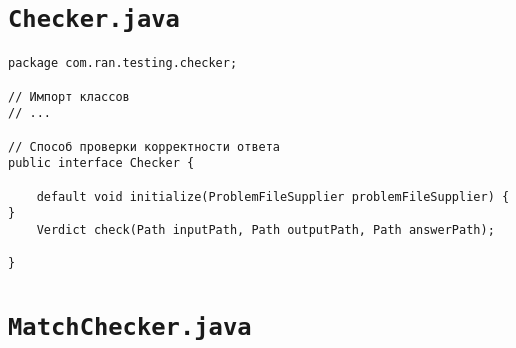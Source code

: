 \section*{\texttt{Checker.java}}
\begin{verbatim}
package com.ran.testing.checker;

// Импорт классов
// ...

// Способ проверки корректности ответа
public interface Checker {

    default void initialize(ProblemFileSupplier problemFileSupplier) { }
    Verdict check(Path inputPath, Path outputPath, Path answerPath);

}
\end{verbatim}

\section*{\texttt{MatchChecker.java}}
